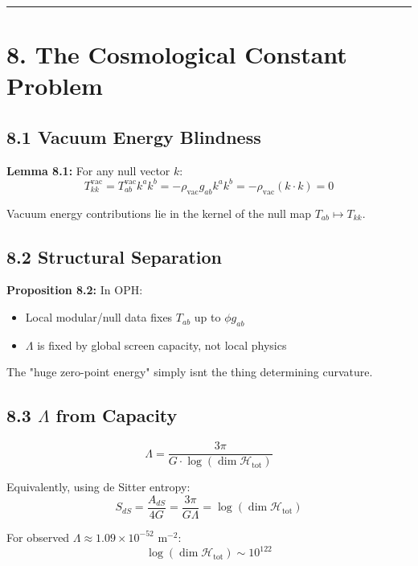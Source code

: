\begin{center}\rule{0.5\linewidth}{0.5pt}\end{center}

\section{8. The Cosmological Constant Problem}\label{8-the-cosmological-constant-problem}

\subsection{8.1 Vacuum Energy Blindness}\label{81-vacuum-energy-blindness}

\textbf{Lemma 8.1:} For any null vector \(k\): \[T^{\text{vac}}_{kk} = T^{\text{vac}}_{ab} k^a k^b = -\rho_{\text{vac}} g_{ab} k^a k^b = -\rho_{\text{vac}}(k \cdot k) = 0\]

Vacuum energy contributions lie in the kernel of the null map \(T_{ab} \mapsto T_{kk}\).

\subsection{8.2 Structural Separation}\label{82-structural-separation}

\textbf{Proposition 8.2:} In OPH:

\begin{itemize}
\tightlist
\item
  Local modular/null data fixes \(T_{ab}\) up to \(\phi g_{ab}\)
\item
  \(\Lambda\) is fixed by global screen capacity, not local physics
\end{itemize}

The "huge zero-point energy" simply isn\textquotesingle t the thing determining curvature.

\subsection{8.3 $\Lambda$ from Capacity}\label{83-ux3bb-from-capacity}

\[\Lambda = \frac{3\pi}{G \cdot \log(\dim \mathcal{H}_{\text{tot}})}\]

Equivalently, using de Sitter entropy: \[S_{dS} = \frac{A_{dS}}{4G} = \frac{3\pi}{G\Lambda} = \log(\dim \mathcal{H}_{\text{tot}})\]

For observed \(\Lambda \approx 1.09 \times 10^{-52}\) m\(^{-2}\): \[\log(\dim \mathcal{H}_{\text{tot}}) \sim 10^{122}\]

